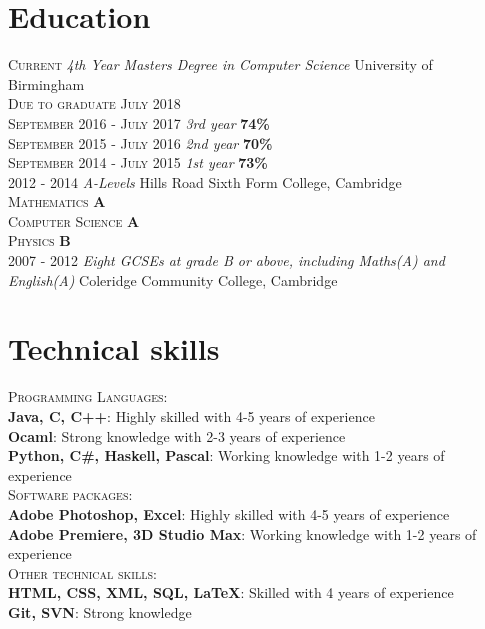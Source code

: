 \documentclass[a4paper, 10pt]{article}
\newcommand\tab[1][1cm]{\hspace*{#1}}
\begin{document}
\section{Education}
\textsc{Current} \emph{4th Year Masters Degree in Computer Science} University of Birmingham\\
 \tab\textsc{Due to graduate July 2018}\\
 \tab\textsc{September 2016 - July 2017} \emph{3rd year} \textbf{74\%} \\
 \tab\textsc{September 2015 - July 2016} \emph{2nd year} \textbf{70\%} \\
 \tab\textsc{September 2014 - July 2015} \emph{1st year} \textbf{73\%}\\
\textsc{2012 - 2014} \emph{A-Levels} Hills Road Sixth Form College, Cambridge \\
	\tab\textsc{Mathematics} \textbf{A} \\
	\tab\textsc{Computer Science} \textbf{A} \\
	\tab\textsc{Physics} \textbf{B}\\
\textsc{2007 - 2012} \emph{Eight GCSEs at grade B or above, including Maths(A) and English(A)} Coleridge Community College, Cambridge

\section{Technical skills}
 \textsc{Programming Languages:}\\
 \tab\textbf{Java, C, C++}: Highly skilled with 4-5 years of experience\\
 \tab\textbf{Ocaml}: Strong knowledge with 2-3 years of experience\\
 \tab\textbf{Python, C\#, Haskell, Pascal}: Working knowledge with 1-2 years of experience\\
 \textsc{Software packages:}\\
 \tab\textbf{Adobe Photoshop, Excel}: Highly skilled with 4-5 years of experience\\
 \tab\textbf{Adobe Premiere, 3D Studio Max}: Working knowledge with 1-2 years of experience\\
 \textsc{Other technical skills:}\\
 \tab\textbf{HTML, CSS, XML, SQL, LaTeX}: Skilled with 4 years of experience\\
 \tab\textbf{Git, SVN}: Strong knowledge

\end{document}
